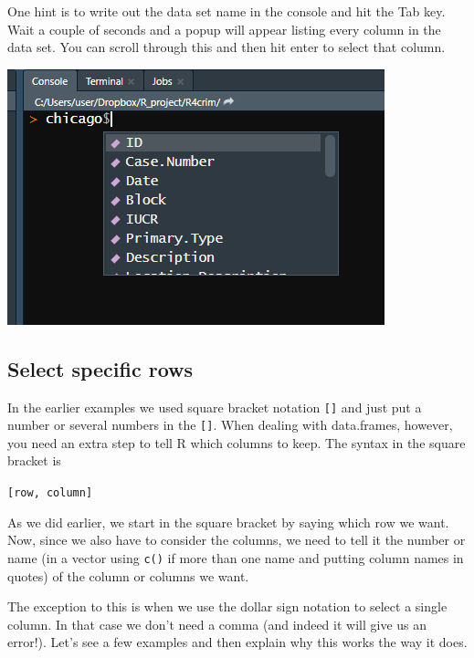 \documentclass[
]{krantz}
\makeatletter
\newenvironment{Shaded}{\begin{snugshade}}{\end{snugshade}}
\newcommand{\CommentTok}[1]{\textcolor[rgb]{0.37,0.37,0.37}{\textit{#1}}}
\newcommand{\FunctionTok}[1]{\textcolor[rgb]{0,0,0}{#1}}
\newcommand{\NormalTok}[1]{#1}
\newcommand{\SpecialCharTok}[1]{\textcolor[rgb]{0,0,0}{#1}}
\newenvironment{kframe}{%
\medskip{}
\setlength{\fboxsep}{.8em}
 \def\at@end@of@kframe{}%
 \ifinner\ifhmode%
  \def\at@end@of@kframe{\end{minipage}}%
  \begin{minipage}{\columnwidth}%
 \fi\fi%
 \def\FrameCommand##1{\hskip\@totalleftmargin \hskip-\fboxsep
 \colorbox{shadecolor}{##1}\hskip-\fboxsep
     \hskip-\linewidth \hskip-\@totalleftmargin \hskip\columnwidth}%
 \MakeFramed {\advance\hsize-\width
   \@totalleftmargin\z@ \linewidth\hsize
   \@setminipage}}%
 {\par\unskip\endMakeFramed%
 \at@end@of@kframe}
\renewenvironment{Shaded}{\begin{kframe}}{\end{kframe}}
\makeatother
\begin{document}
\begin{Shaded}
\end{Shaded}

One hint is to write out the data set name in the console and hit the Tab key. Wait a couple of seconds and a popup will appear listing every column in the data set. You can scroll through this and then hit enter to select that column.

\includegraphics{images/tab_example.png}

\hypertarget{select-specific-rows}{%
\subsection{Select specific rows}\label{select-specific-rows}}

In the earlier examples we used square bracket notation \texttt{{[}{]}} and just put a number or several numbers in the \texttt{{[}{]}}. When dealing with data.frames, however, you need an extra step to tell R which columns to keep. The syntax in the square bracket is

\texttt{{[}row,\ column{]}}

As we did earlier, we start in the square bracket by saying which row we want. Now, since we also have to consider the columns, we need to tell it the number or name (in a vector using \texttt{c()} if more than one name and putting column names in quotes) of the column or columns we want.

The exception to this is when we use the dollar sign notation to select a single column. In that case we don't need a comma (and indeed it will give us an error!). Let's see a few examples and then explain why this works the way it does.
\end{document}
